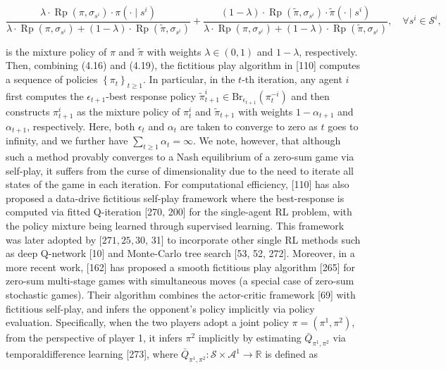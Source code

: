 \documentclass[10pt]{article}
\begin{document}
\[
\frac{\lambda \cdot \operatorname{Rp}\left(\pi, \sigma_{s^{i}}\right) \cdot \pi\left(\cdot \mid s^{i}\right)}{\lambda \cdot \operatorname{Rp}\left(\pi, \sigma_{s^{i}}\right)+(1-\lambda) \cdot \operatorname{Rp}\left(\widetilde{\pi}, \sigma_{s^{i}}\right)}+\frac{(1-\lambda) \cdot \operatorname{Rp}\left(\widetilde{\pi}, \sigma_{s^{i}}\right) \cdot \widetilde{\pi}\left(\cdot \mid s^{i}\right)}{\lambda \cdot \operatorname{Rp}\left(\pi, \sigma_{s^{i}}\right)+(1-\lambda) \cdot \operatorname{Rp}\left(\widetilde{\pi}, \sigma_{s^{i}}\right)}, \quad \forall s^{i} \in \mathcal{S}^{i},
\]

is the mixture policy of $\pi$ and $\widetilde{\pi}$ with weights $\lambda \in(0,1)$ and $1-\lambda$, respectively. Then, combining (4.16) and (4.19), the fictitious play algorithm in [110] computes a sequence of policies $\left\{\pi_{t}\right\}_{t \geq 1}$. In particular, in the $t$-th iteration, any agent $i$ first computes the $\epsilon_{t+1}$-best response policy $\widetilde{\pi}_{t+1}^{i} \in \mathrm{Br}_{\epsilon_{t+1}}\left(\pi_{t}^{-i}\right)$ and then constructs $\pi_{t+1}^{i}$ as the mixture policy of $\pi_{t}^{i}$ and $\widetilde{\pi}_{t+1}$ with weights $1-\alpha_{t+1}$ and $\alpha_{t+1}$, respectively. Here, both $\epsilon_{t}$ and $\alpha_{t}$ are taken to converge to zero as $t$ goes to infinity, and we further have $\sum_{t \geq 1} \alpha_{t}=\infty$. We note, however, that although such a method provably converges to a Nash equilibrium of a zero-sum game via self-play, it suffers from the curse of dimensionality due to the need to iterate all states of the game in each iteration. For computational efficiency, [110] has also proposed a data-drive fictitious self-play framework where the best-response is computed via fitted Q-iteration [270, 200] for the single-agent RL problem, with the policy mixture being learned through supervised learning. This framework was later adopted by $[271,25,30$, 31] to incorporate other single RL methods such as deep Q-network [10] and Monte-Carlo tree search [53, 52, 272]. Moreover, in a more recent work, [162] has proposed a smooth fictitious play algorithm [265] for zero-sum multi-stage games with simultaneous moves (a special case of zero-sum stochastic games). Their algorithm combines the actor-critic framework [69] with fictitious self-play, and infers the opponent's policy implicitly via policy evaluation. Specifically, when the two players adopt a joint policy $\pi=\left(\pi^{1}, \pi^{2}\right)$, from the perspective of player 1, it infers $\pi^{2}$ implicitly by estimating $\bar{Q}_{\pi^{1}, \pi^{2}}$ via temporaldifference learning [273], where $\bar{Q}_{\pi^{1}, \pi^{2}}: \mathcal{S} \times \mathcal{A}^{1} \rightarrow \mathbb{R}$ is defined as
\end{document}
